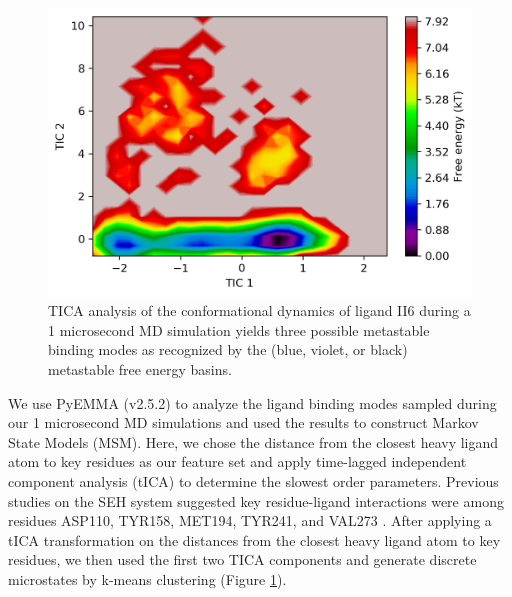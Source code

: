 \begin{figure}
    \centering
    \includegraphics{chapter5/II6/II6_1-full-tiCA.png}
    \caption[TICA Analysis of Ligand II6]{TICA analysis of the conformational dynamics of ligand II6 during a 1 microsecond MD simulation yields three possible metastable binding modes as recognized by the (blue, violet, or black) metastable free energy basins.}
    \label{fig:II6_1_tica-kmeans}
\end{figure}

We use PyEMMA (v2.5.2) to analyze the ligand binding modes sampled during our 1 microsecond MD simulations and used the results to construct Markov State Models (MSM)\cite{scherer_pyemma_2015}. 
Here, we chose the distance from the closest heavy ligand atom to key residues as our feature set and apply time-lagged independent component analysis (tICA) \cite{perez-hernandez_identification_2013} to determine the slowest order parameters. 
Previous studies on the SEH system suggested key residue-ligand interactions were among residues ASP110, TYR158, MET194, TYR241, and VAL273 \cite{lotz_unbiased_2018}. 
After applying a tICA transformation on the distances from the closest heavy ligand atom to key residues, we then used the first two TICA components and generate discrete microstates by k-means clustering (Figure \ref{fig:II6_1_tica-kmeans}).

